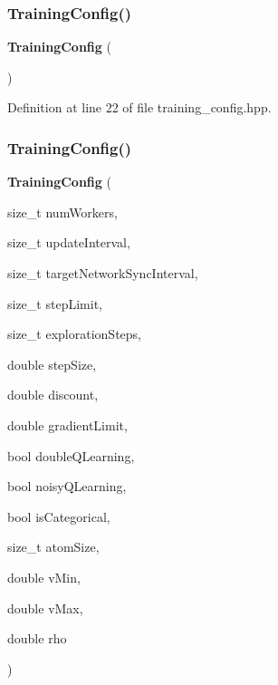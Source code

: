 \subsubsection{Training\+Config()\hspace{0.1cm}{\footnotesize\ttfamily [1/2]}}
{\footnotesize\ttfamily \textbf{ Training\+Config} (\begin{DoxyParamCaption}{ }\end{DoxyParamCaption})\hspace{0.3cm}{\ttfamily [inline]}}



Definition at line 22 of file training\+\_\+config.\+hpp.

\mbox{\label{classmlpack_1_1rl_1_1TrainingConfig_a3b78e9485faa6307c63cf980850ee615}} 
\subsubsection{Training\+Config()\hspace{0.1cm}{\footnotesize\ttfamily [2/2]}}
{\footnotesize\ttfamily \textbf{ Training\+Config} (\begin{DoxyParamCaption}\item[{size\+\_\+t}]{num\+Workers,  }\item[{size\+\_\+t}]{update\+Interval,  }\item[{size\+\_\+t}]{target\+Network\+Sync\+Interval,  }\item[{size\+\_\+t}]{step\+Limit,  }\item[{size\+\_\+t}]{exploration\+Steps,  }\item[{double}]{step\+Size,  }\item[{double}]{discount,  }\item[{double}]{gradient\+Limit,  }\item[{bool}]{double\+Q\+Learning,  }\item[{bool}]{noisy\+Q\+Learning,  }\item[{bool}]{is\+Categorical,  }\item[{size\+\_\+t}]{atom\+Size,  }\item[{double}]{v\+Min,  }\item[{double}]{v\+Max,  }\item[{double}]{rho }\end{DoxyParamCaption})\hspace{0.3cm}{\ttfamily [inline]}}



